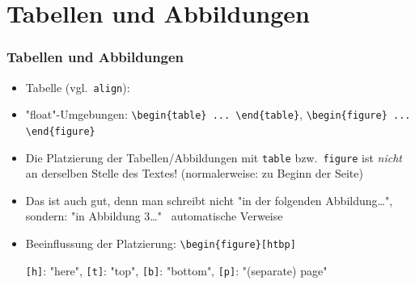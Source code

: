 \section{Tabellen und Abbildungen}

\begin{frame}[<+->][fragile]
	\frametitle{Tabellen und Abbildungen}
	\begin{itemize}
		\item Tabelle (vgl.\ \lstinline!align!):
		
		\item "float"-Umgebungen: \lstinline!\begin{table} ... \end{table}!, \lstinline!\begin{figure} ... \end{figure}!
		\item Die Platzierung der Tabellen/Abbildungen mit \lstinline!table! bzw.\ \lstinline!figure! ist \emph{nicht} an derselben Stelle des Textes! (normalerweise: zu Beginn der Seite)
		\item Das ist auch gut, denn man schreibt nicht "in der folgenden Abbildung…", sondern: "in Abbildung 3…"
		\textrightarrow~automatische Verweise
		\item Beeinflussung der Platzierung: \lstinline!\begin{figure}[htbp]!
		
		\lstinline![h]!: "here", \lstinline![t]!: "top", \lstinline![b]!: "bottom", \lstinline![p]!: "(separate) page"
	\end{itemize}
\end{frame}


